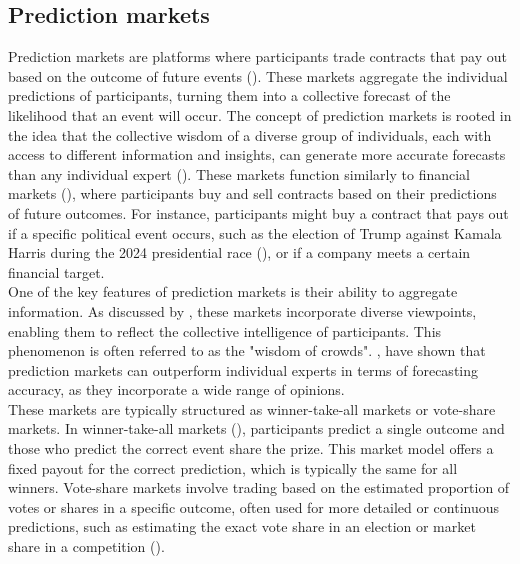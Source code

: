 \documentclass[12pt]{report}
\begin{document}
\subsection{Prediction markets}

Prediction markets are platforms where participants trade contracts that pay out based on the outcome of future events (\cite{wolfers_prediction_2004}). These markets aggregate the individual predictions of participants, turning them into a collective forecast of the likelihood that an event will occur. The concept of prediction markets is rooted in the idea that the collective wisdom of a diverse group of individuals, each with access to different information and insights, can generate more accurate forecasts than any individual expert (\cite{bossaerts_price_2022}). These markets function similarly to financial markets (\cite{wolfers_prediction_2004}), where participants buy and sell contracts based on their predictions of future outcomes. For instance, participants might buy a contract that pays out if a specific political event occurs, such as the election of Trump against Kamala Harris during the 2024 presidential race (\cite{mongrain_introduction_2024}), or if a company meets a certain financial target.\\

One of the key features of prediction markets is their ability to aggregate information. As discussed by \cite{bossaerts_price_2022}, these markets incorporate diverse viewpoints, enabling them to reflect the collective intelligence of participants. This phenomenon is often referred to as the "wisdom of crowds". \cite{berg_prediction_2008}, have shown that prediction markets can outperform individual experts in terms of forecasting accuracy, as they incorporate a wide range of opinions. \\

These markets are typically structured as winner-take-all markets or vote-share markets. In winner-take-all markets (\cite{dai_wisdom_2021}), participants predict a single outcome and those who predict the correct event share the prize. This market model offers a fixed payout for the correct prediction, which is typically the same for all winners. Vote-share markets involve trading based on the estimated proportion of votes or shares in a specific outcome, often used for more detailed or continuous predictions, such as estimating the exact vote share in an election or market share in a competition (\cite{dai_wisdom_2021}).\\
\end{document}
